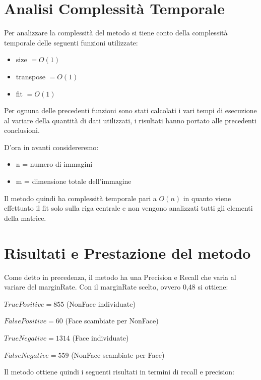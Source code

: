 \documentclass[
  italian,
]{article}
\providecommand{\tightlist}{%
  \setlength{\itemsep}{0pt}\setlength{\parskip}{0pt}}
\begin{document}
\hypertarget{analisi-complessituxe0-temporale}{%
\section{Analisi Complessità
Temporale}\label{analisi-complessituxe0-temporale}}

Per analizzare la complessità del metodo si tiene conto della
complessità temporale delle seguenti funzioni utilizzate:

\begin{itemize}
\tightlist
\item
  size \(= O(1)\)
\item
  transpose \(= O(1)\)
\item
  fit \(= O(1)\)
\end{itemize}

Per ognuna delle precedenti funzioni sono stati calcolati i vari tempi
di esecuzione al variare della quantità di dati utilizzati, i risultati
hanno portato alle precedenti conclusioni.

D'ora in avanti considereremo:

\begin{itemize}
\tightlist
\item
  n = numero di immagini
\item
  m = dimensione totale dell'immagine
\end{itemize}

Il metodo quindi ha complessità temporale pari a \(O(n)\) in
quanto viene effettuato il fit solo sulla riga centrale e non vengono analizzati tutti gli elementi della matrice.

\hypertarget{risultati-e-prestazione-del-metodo}{%
\section{Risultati e Prestazione del
metodo}\label{risultati-e-prestazione-del-metodo}}

Come detto in precedenza, il metodo ha una Precision e Recall che varia al variare del marginRate.
Con il marginRate scelto, ovvero 0,48 si ottiene:

\(True Positive = 855\) (NonFace individuate)

\(False Positive = 60\) (Face scambiate per NonFace)

\(True Negative = 1314\) (Face individuate)

\(False Negative = 559\) (NonFace scambiate per Face)

\bigskip
Il metodo ottiene quindi i seguenti risultati in termini di recall e
precision:
\end{document}

